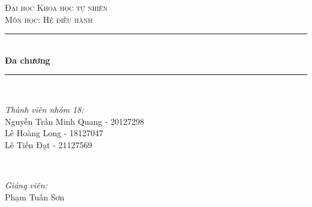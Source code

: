 \begin{titlepage}

\newcommand{\HRule}{\rule{\linewidth}{0.5mm}} %

\center %
 

\textsc{\LARGE Đại học Khoa học tự nhiên}\\[1.0cm] %
\textsc{\large Môn học: Hệ điều hành }\\[0.5cm] %


\HRule \\[0.4cm]
{ \huge \bfseries Đa chương}\\[0.2cm] %
\HRule \\[1.5cm]
 

\begin{minipage}{0.4\textwidth}
\begin{flushleft} \large
\emph{Thành viên nhóm 18:}\\
{\fontsize{10}{12}\selectfont Nguyễn Trần Minh Quang - 20127298}\\
{\fontsize{10}{12}\selectfont Lê Hoàng Long - 18127047}\\
{\fontsize{10}{12}\selectfont Lê Tiến Đạt - 21127569}\\
\end{flushleft}
\end{minipage}
~
\begin{minipage}{0.4\textwidth}
\begin{flushright} \large
\emph{Giảng viên:} \\
Phạm Tuấn Sơn %
\end{flushright}
\end{minipage}\\[1cm]


\end{titlepage}
